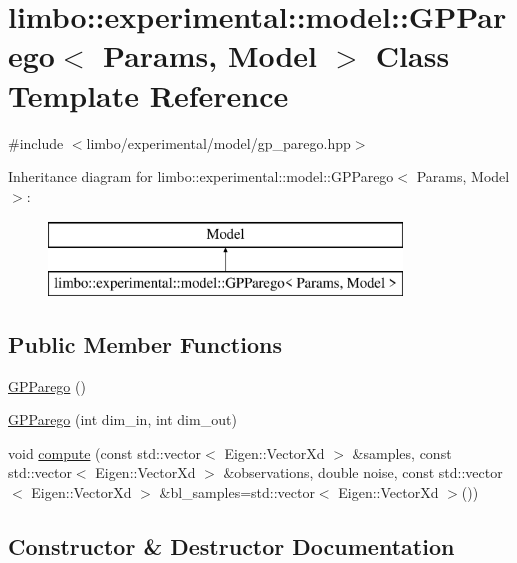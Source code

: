 \hypertarget{classlimbo_1_1experimental_1_1model_1_1_g_p_parego}{}\section{limbo\+:\+:experimental\+:\+:model\+:\+:G\+P\+Parego$<$ Params, Model $>$ Class Template Reference}
\label{classlimbo_1_1experimental_1_1model_1_1_g_p_parego}


{\ttfamily \#include $<$limbo/experimental/model/gp\+\_\+parego.\+hpp$>$}

Inheritance diagram for limbo\+:\+:experimental\+:\+:model\+:\+:G\+P\+Parego$<$ Params, Model $>$\+:\begin{figure}[H]
\begin{center}
\leavevmode
\includegraphics[height=2.000000cm]{classlimbo_1_1experimental_1_1model_1_1_g_p_parego}
\end{center}
\end{figure}
\subsection*{Public Member Functions}
\begin{DoxyCompactItemize}
\item 
\hyperlink{classlimbo_1_1experimental_1_1model_1_1_g_p_parego_ac351d6798add22da5c6dd58ac4a00723}{G\+P\+Parego} ()
\item 
\hyperlink{classlimbo_1_1experimental_1_1model_1_1_g_p_parego_a1f0eb578140f01874b13bfca124c085c}{G\+P\+Parego} (int dim\+\_\+in, int dim\+\_\+out)
\item 
void \hyperlink{classlimbo_1_1experimental_1_1model_1_1_g_p_parego_ae70c804aa8c90057844e49af1ffb9fa5}{compute} (const std\+::vector$<$ Eigen\+::\+Vector\+Xd $>$ \&samples, const std\+::vector$<$ Eigen\+::\+Vector\+Xd $>$ \&observations, double noise, const std\+::vector$<$ Eigen\+::\+Vector\+Xd $>$ \&bl\+\_\+samples=std\+::vector$<$ Eigen\+::\+Vector\+Xd $>$())
\end{DoxyCompactItemize}


\subsection{Constructor \& Destructor Documentation}
\hypertarget{classlimbo_1_1experimental_1_1model_1_1_g_p_parego_ac351d6798add22da5c6dd58ac4a00723}{}
